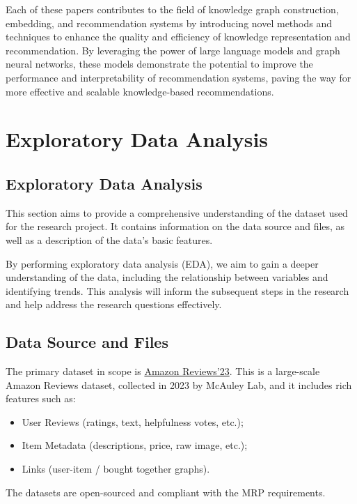 \documentclass{article}
\begin{document}
Each of these papers contributes to the field of knowledge graph construction, embedding, and recommendation systems by introducing novel methods and techniques to enhance the quality and efficiency of knowledge representation and recommendation. By leveraging the power of large language models and graph neural networks, these models demonstrate the potential to improve the performance and interpretability of recommendation systems, paving the way for more effective and scalable knowledge-based recommendations.

\section{Exploratory Data Analysis}

\subsection{Exploratory Data Analysis}

This section aims to provide a comprehensive understanding of the dataset used for the research project. It contains information on the data source and files, as well as a description of the data's basic features. 

By performing exploratory data analysis (EDA), we aim to gain a deeper understanding of the data, including the relationship between variables and identifying trends. This analysis will inform the subsequent steps in the research and help address the research questions effectively.

\subsection{Data Source and Files}

The primary dataset in scope is \href{https://amazon-reviews-2023.github.io/index.html}{Amazon Reviews'23}. This is a large-scale Amazon Reviews dataset, collected in 2023 by McAuley Lab, and it includes rich features such as:
\begin {itemize}
\item User Reviews (ratings, text, helpfulness votes, etc.);
\item Item Metadata (descriptions, price, raw image, etc.);
\item Links (user-item / bought together graphs).
\end {itemize}

The datasets are open-sourced and compliant with the MRP requirements. 
\end{document}

